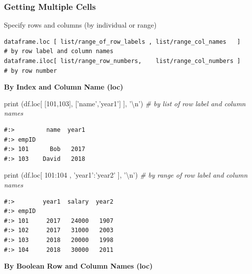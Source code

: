 \documentclass[
]{book}
\newenvironment{Shaded}{\begin{snugshade}}{\end{snugshade}}
\newcommand{\BuiltInTok}[1]{#1}
\newcommand{\CharTok}[1]{\textcolor[rgb]{0.5,0.5,0.5}{#1}}
\newcommand{\CommentTok}[1]{\textcolor[rgb]{0.37,0.37,0.37}{\textit{#1}}}
\newcommand{\DecValTok}[1]{\textcolor[rgb]{0.06,0.06,0.06}{#1}}
\newcommand{\NormalTok}[1]{#1}
\newcommand{\StringTok}[1]{\textcolor[rgb]{0.5,0.5,0.5}{#1}}
\begin{document}
\hypertarget{getting-multiple-cells}{%
\subsubsection{Getting Multiple Cells}\label{getting-multiple-cells}}

Specify rows and columns (by individual or range)

\begin{verbatim}
dataframe.loc [ list/range_of_row_labels , list/range_col_names   ]    # by row label and column names
dataframe.iloc[ list/range_row_numbers,    list/range_col_numbers ]    # by row number
\end{verbatim}

\textbf{By Index and Column Name (loc)}

\begin{Shaded}
\begin{Highlighting}[]
\BuiltInTok{print}\NormalTok{ (df.loc[ [}\DecValTok{101}\NormalTok{,}\DecValTok{103}\NormalTok{], [}\StringTok{'name'}\NormalTok{,}\StringTok{'year1'}\NormalTok{] ], }\StringTok{'}\CharTok{\textbackslash{}n}\StringTok{'}\NormalTok{)  }\CommentTok{# by list of row label and column names}
\end{Highlighting}
\end{Shaded}

\begin{verbatim}
#:>         name  year1
#:> empID              
#:> 101      Bob   2017
#:> 103    David   2018
\end{verbatim}

\begin{Shaded}
\begin{Highlighting}[]
\BuiltInTok{print}\NormalTok{ (df.loc[  }\DecValTok{101}\NormalTok{:}\DecValTok{104}\NormalTok{ ,  }\StringTok{'year1'}\NormalTok{:}\StringTok{'year2'}\NormalTok{  ], }\StringTok{'}\CharTok{\textbackslash{}n}\StringTok{'}\NormalTok{)  }\CommentTok{# by range of row label and column names}
\end{Highlighting}
\end{Shaded}

\begin{verbatim}
#:>        year1  salary  year2
#:> empID                      
#:> 101     2017   24000   1907
#:> 102     2017   31000   2003
#:> 103     2018   20000   1998
#:> 104     2018   30000   2011
\end{verbatim}

\textbf{By Boolean Row and Column Names (loc)}
\end{document}
